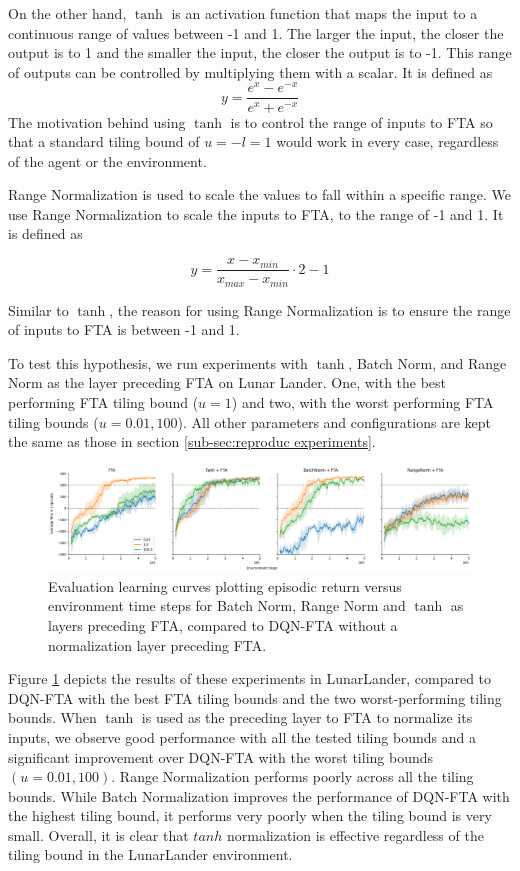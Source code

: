 \documentclass{article}
\begin{document}
On the other hand, $\tanh$ is an activation function that maps the input to a continuous range of values between -1 and 1.
The larger the input, the closer the output is to 1 and the smaller the input, the closer the output is to -1.
This range of outputs can be controlled by multiplying them with a scalar.
It is defined as
 \begin{equation}
    y = \frac{e^x-e^{-x}}{e^x+e^{-x}}
    \label{eq:tanh}
 \end{equation}
The motivation behind using $\tanh$ is to control the range of inputs to FTA so that a standard tiling bound of $u = -l = 1$ would work in every case, regardless of the agent or the environment.

Range Normalization is used to scale the values to fall within a specific range.
We use Range Normalization to scale the inputs to FTA, to the range of -1 and 1. It is defined as

 \begin{equation}
    y = \frac{x - x_{min}}{x_{max} - x_{min}} \cdot 2 - 1
    \label{eq:rangenorm}
 \end{equation}

 Similar to $\tanh$, the reason for using Range Normalization is to ensure the range of inputs to FTA is between -1 and 1.

To test this hypothesis, we run experiments with $\tanh$, Batch Norm, and Range Norm as the layer preceding FTA on Lunar Lander.
One, with the best performing FTA tiling bound ($u = 1$) and two, with the worst performing FTA tiling bounds ($u = 0.01, 100$).
All other parameters and configurations are kept the same as those in section \ref{sub-sec:reproduc experiments}.

\begin{figure}[h]
    \centering
    \includegraphics[width=12cm]{normalizing.png}
    \caption{Evaluation learning curves plotting episodic return versus environment time steps for Batch Norm, Range Norm and $\tanh$ as layers preceding FTA, compared to DQN-FTA without a normalization layer preceding FTA.}
    \label{fig:bnvtanh}
\end{figure}

Figure \ref{fig:bnvtanh} depicts the results of these experiments in LunarLander, compared to DQN-FTA with the best FTA tiling bounds and the two worst-performing tiling bounds. When $\tanh$ is used as the preceding layer to FTA to normalize its inputs, we observe good performance with all the tested tiling bounds and a significant improvement over DQN-FTA with the worst tiling bounds $(u = 0.01, 100)$. Range Normalization performs poorly across all the tiling bounds. While Batch Normalization improves the performance of DQN-FTA with the highest tiling bound, it performs very poorly when the tiling bound is very small. Overall, it is clear that $tanh$ normalization is effective regardless of the tiling bound in the LunarLander environment.
\end{document}
